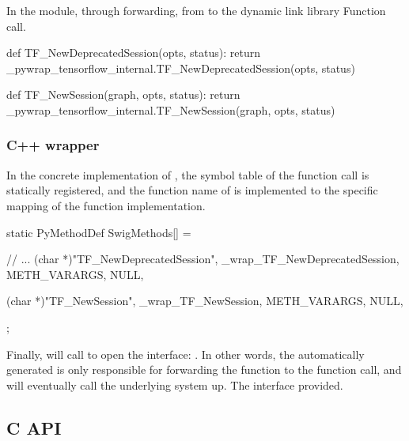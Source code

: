 \begin{content}
In the  module, through  forwarding, from  to the dynamic link library  Function call.

\begin{leftbar}
\begin{python}[caption={tensorflow/bazel-bin/tensorflow/python/pywrap\_tensorflow\_internal.py}]
def TF_NewDeprecatedSession(opts, status):
  return _pywrap_tensorflow_internal.TF_NewDeprecatedSession(opts, status)

def TF_NewSession(graph, opts, status):
  return _pywrap_tensorflow_internal.TF_NewSession(graph, opts, status)
\end{python}
\end{leftbar}

\subsubsection{C++ wrapper}

In the concrete implementation of , the symbol table of the function call is statically registered, and the function name of  is implemented to the specific mapping of the \cpp{} function implementation.

\begin{leftbar}
\begin{c++}[caption={tensorflow/bazel-bin/tensorflow/python/pywrap\_tensorflow\_internal.cc}]
static PyMethodDef SwigMethods[] = {
  // ...
  { (char *)"TF_NewDeprecatedSession", 
    _wrap_TF_NewDeprecatedSession, METH_VARARGS, NULL},

  { (char *)"TF_NewSession", 
    _wrap_TF_NewSession, METH_VARARGS, NULL},
};
\end{c++}
\end{leftbar}

Finally,  will call  to open the  interface: . In other words, the automatically generated  is only responsible for forwarding the  function to the  function call, and will eventually call the underlying  system up. The  interface provided.

\subsection{C API}


\end{content}
